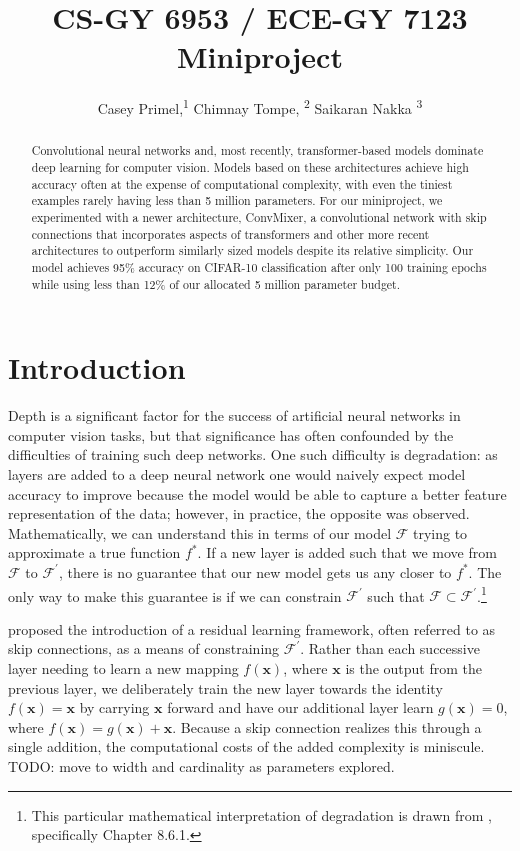 \documentclass[letterpaper]{article} %
\title{CS-GY 6953 / ECE-GY 7123 Miniproject}
\author {
    Casey Primel,\textsuperscript{\rm 1}
    Chimnay Tompe, \textsuperscript{\rm 2}
    Saikaran Nakka \textsuperscript{\rm 3}
}
\begin{document}
\maketitle

\begin{abstract}
Convolutional neural networks and, most recently, transformer-based models dominate deep learning for computer vision. Models based on these architectures achieve high accuracy often at the expense of computational complexity, with even the tiniest examples rarely having less than 5 million parameters. For our miniproject, we experimented with a newer architecture, ConvMixer, a convolutional network with skip connections that incorporates aspects of transformers and other more recent architectures to outperform similarly sized models despite its relative simplicity. Our model achieves 95\% accuracy on CIFAR-10 classification after only 100 training epochs while using less than 12\% of our allocated 5 million parameter budget.
\end{abstract}

\section{Introduction}

Depth is a significant factor for the success of artificial neural networks in computer vision tasks, but that significance has often confounded by the difficulties of training such deep networks. One such difficulty is degradation: as layers are added to a deep neural network one would naively expect model accuracy to improve because the model would be able to capture a better feature representation of the data; however, in practice, the opposite was observed. Mathematically, we can understand this in terms of our model $\mathcal{F}$ trying to approximate a true function $f^*$. If a new layer is added such that we move from $\mathcal{F}$ to $\mathcal{F}^\prime$, there is no guarantee that our new model gets us any closer to $f^*$. The only way to make this guarantee is if we can constrain $\mathcal{F}^\prime$ such that $\mathcal{F} \subset \mathcal{F}^\prime$.\footnote{This particular mathematical interpretation of degradation is drawn from \citet{zhang2021dive}, specifically Chapter 8.6.1.}


\citet{he2015} proposed the introduction of a residual learning framework, often referred to as skip connections, as a means of constraining $\mathcal{F}^\prime$. Rather than each successive layer needing to learn a new mapping $f(\mathbf{x})$, where $\mathbf{x}$ is the output from the previous layer, we deliberately train the new layer towards the identity $f(\mathbf{x})=\mathbf{x}$ by carrying $\mathbf{x}$ forward and have our additional layer learn $g(\mathbf{x}) = 0$, where $f(\mathbf{x})= g(\mathbf{x}) + \mathbf{x}$. Because a skip connection realizes this through a single addition, the computational costs of the added complexity is miniscule. TODO: move to width and cardinality as parameters explored.
\end{document}
